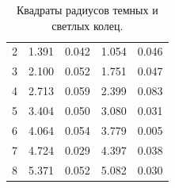 \documentclass[a4paper, 12pt]{article}
\begin{document}
\begin{enumerate}
\begin{table}[h]
\begin{tabular}{|c|c|c|c|c|}
 					2 & 1.391 & 0.042 & 1.054 & 0.046 \\
 					3 & 2.100 & 0.052 & 1.751 & 0.047 \\
 					4 & 2.713 & 0.059 & 2.399 & 0.083 \\
 					5 & 3.404 & 0.050 & 3.080 & 0.031 \\
 					6 & 4.064 & 0.054 & 3.779 & 0.005 \\
 					7 & 4.724 & 0.029 & 4.397 & 0.038 \\
 					8 & 5.371 & 0.052 & 5.082 & 0.030 \\
 					\hline
				\end{tabular}
				\caption{Квадраты радиусов темных и светлых колец.}
			\end{table}
	\end{enumerate}
\end{document}
